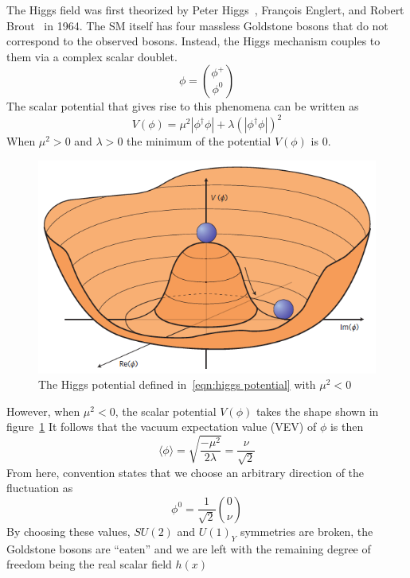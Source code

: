 		The Higgs field was first theorized by Peter Higgs~\cite{Higgs-paper}, François Englert, and Robert Brout~\cite{Englert-Brout} in 1964.  The SM itself has four massless Goldstone bosons that do not correspond to the observed bosons. Instead, the Higgs mechanism couples to them via a complex scalar doublet. 
		\begin{equation}\label{eqn:scal doub} \phi = \binom{\phi^+}{\phi^0}\end{equation}
		The scalar potential that gives rise to this phenomena can be written as 
		\begin{equation}\label{eqn:higgs potential} V(\phi) = \mu^2 |\phi^{\dagger}\phi| + \lambda (|\phi^{\dagger}\phi|)^2\end{equation}
		When $\mu^2>0$ and $\lambda>0$ the minimum of the potential $V(\phi)$ is 0. 
		\begin{figure}[!ht] \centering \includegraphics[width=.7\textwidth,keepaspectratio=true]{chapters/chapter1_theory/images/higgspotential.png} \caption{The Higgs potential defined in~\ref{eqn:higgs potential} with $\mu^2<0$ ~\cite{Higgs-phys}} \label{fig:higgs-potential}\end{figure}
		However, when $\mu^2<0$, the scalar potential $V(\phi)$ takes the shape shown in figure~\ref{fig:higgs-potential}
		It follows that the vacuum expectation value (VEV) of $\phi$ is then 
		\begin{equation}\label{eqn:higgs vev} \langle \phi \rangle = \sqrt{\frac{-\mu^2}{2\lambda}} = \frac{\nu}{\sqrt{2}}	\end{equation}
		From here, convention states that we choose an arbitrary direction of the fluctuation as 
		\begin{equation}\label{eqn:phi zero} \phi^0 = \frac{1}{\sqrt{2}} \binom{0}{\nu} \end{equation}
		By choosing these values, $SU(2)$ and $U(1)_Y$ symmetries are broken, the Goldstone bosons are ``eaten'' and we are left with the remaining degree of freedom being the real scalar field $h(x)$
